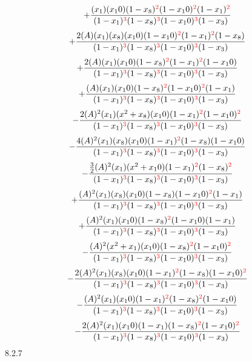 \documentclass{article}
\begin{document}
\[+\frac{(x_1)(x_10)(1-x_8)^{\textcolor{red}{2}}(1-x_10)^{\textcolor{red}{2}}(1-x_1)^{\textcolor{red}{2}}}{(1-x_1)^{\textcolor{red}{3}}(1-x_8)^{\textcolor{red}{3}}(1-x_10)^{\textcolor{red}{3}}(1-x_3)}\]\[+\frac{2(A)(x_1)(x_8)(x_10)(1-x_10)^{\textcolor{red}{2}}(1-x_1)^{\textcolor{red}{2}}(1-x_8)}{(1-x_1)^{\textcolor{red}{3}}(1-x_8)^{\textcolor{red}{3}}(1-x_10)^{\textcolor{red}{3}}(1-x_3)}\]\[+\frac{2(A)(x_1)(x_10)(1-x_8)^{\textcolor{red}{2}}(1-x_1)^{\textcolor{red}{2}}(1-x_10)}{(1-x_1)^{\textcolor{red}{3}}(1-x_8)^{\textcolor{red}{3}}(1-x_10)^{\textcolor{red}{3}}(1-x_3)}\]\[+\frac{(A)(x_1)(x_10)(1-x_8)^{\textcolor{red}{2}}(1-x_10)^{\textcolor{red}{2}}(1-x_1)}{(1-x_1)^{\textcolor{red}{3}}(1-x_8)^{\textcolor{red}{3}}(1-x_10)^{\textcolor{red}{3}}(1-x_3)}\]\[-\frac{2(A)^{2}(x_1)(x^{2}+x_8)(x_10)(1-x_1)^{\textcolor{red}{2}}(1-x_10)^{\textcolor{red}{2}}}{(1-x_1)^{\textcolor{red}{3}}(1-x_8)^{\textcolor{red}{3}}(1-x_10)^{\textcolor{red}{3}}(1-x_3)}\]\[-\frac{4(A)^{2}(x_1)(x_8)(x_10)(1-x_1)^{\textcolor{red}{2}}(1-x_8)(1-x_10)}{(1-x_1)^{\textcolor{red}{3}}(1-x_8)^{\textcolor{red}{3}}(1-x_10)^{\textcolor{red}{3}}(1-x_3)}\]\[-\frac{\frac{3}{2}(A)^{2}(x_1)(x^{2}+x_10)(1-x_1)^{\textcolor{red}{2}}(1-x_8)^{\textcolor{red}{2}}}{(1-x_1)^{\textcolor{red}{3}}(1-x_8)^{\textcolor{red}{3}}(1-x_10)^{\textcolor{red}{3}}(1-x_3)}\]\[+\frac{(A)^{2}(x_1)(x_8)(x_10)(1-x_8)(1-x_10)^{\textcolor{red}{2}}(1-x_1)}{(1-x_1)^{\textcolor{red}{3}}(1-x_8)^{\textcolor{red}{3}}(1-x_10)^{\textcolor{red}{3}}(1-x_3)}\]\[+\frac{(A)^{2}(x_1)(x_10)(1-x_8)^{\textcolor{red}{2}}(1-x_10)(1-x_1)}{(1-x_1)^{\textcolor{red}{3}}(1-x_8)^{\textcolor{red}{3}}(1-x_10)^{\textcolor{red}{3}}(1-x_3)}\]\[-\frac{(A)^{2}(x^{2}+x_1)(x_10)(1-x_8)^{\textcolor{red}{2}}(1-x_10)^{\textcolor{red}{2}}}{(1-x_1)^{\textcolor{red}{3}}(1-x_8)^{\textcolor{red}{3}}(1-x_10)^{\textcolor{red}{3}}(1-x_3)}\]\[-\frac{2(A)^{2}(x_1)(x_8)(x_10)(1-x_1)^{\textcolor{red}{2}}(1-x_8)(1-x_10)^{\textcolor{red}{2}}}{(1-x_1)^{\textcolor{red}{3}}(1-x_8)^{\textcolor{red}{3}}(1-x_10)^{\textcolor{red}{3}}(1-x_3)}\]\[-\frac{(A)^{2}(x_1)(x_10)(1-x_1)^{\textcolor{red}{2}}(1-x_8)^{\textcolor{red}{2}}(1-x_10)}{(1-x_1)^{\textcolor{red}{3}}(1-x_8)^{\textcolor{red}{3}}(1-x_10)^{\textcolor{red}{3}}(1-x_3)}\]\[-\frac{2(A)^{2}(x_1)(x_10)(1-x_1)(1-x_8)^{\textcolor{red}{2}}(1-x_10)^{\textcolor{red}{2}}}{(1-x_1)^{\textcolor{red}{3}}(1-x_8)^{\textcolor{red}{3}}(1-x_10)^{\textcolor{red}{3}}(1-x_3)}\]
8.2.7
\end{document}
